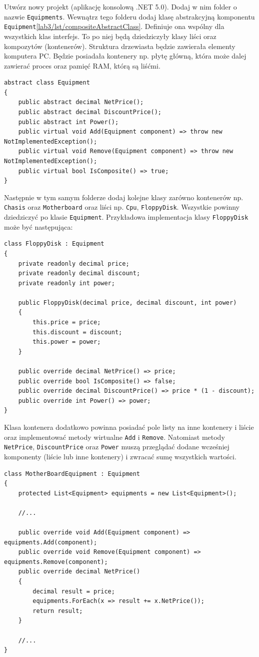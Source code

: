 Utwórz nowy projekt (aplikację konsolową .NET 5.0). Dodaj w nim folder o nazwie \texttt{Equipments}. Wewnątrz tego folderu dodaj klasę abstrakcyjną komponentu \texttt{Equipment}\ref{lab3/lst/compositeAbstractClass}. Definiuje ona wspólny dla wszystkich klas interfejs. To po niej będą dziedziczyły klasy liści oraz kompozytów (kontenerów). Struktura drzewiasta będzie zawierała elementy komputera PC. Będzie posiadała kontenery np. płytę główną, która może dalej zawierać proces oraz pamięć RAM, którą są liśćmi.
\begin{lstlisting}[caption={Przykład abstrakcyjnej klasy komponentu}, label={lab3/lst/compositeAbstractClass}]
abstract class Equipment
{
	public abstract decimal NetPrice();
	public abstract decimal DiscountPrice();	
	public abstract int Power();
	public virtual void Add(Equipment component) => throw new NotImplementedException();	
	public virtual void Remove(Equipment component) => throw new NotImplementedException();
	public virtual bool IsComposite() => true;
}
\end{lstlisting}
Następnie w tym samym folderze dodaj kolejne klasy zarówno kontenerów np. \texttt{Chasis} oraz \texttt{Motherboard} oraz liści np. \texttt{Cpu}, \texttt{FloppyDisk}. Wszystkie powinny dziedziczyć po klasie \texttt{Equipment}. Przykładowa implementacja klasy \texttt{FloppyDisk} może być następująca:
\begin{lstlisting}[caption={Przykład klasy będącej liściem kompozytu}, label={lab3/lst/compositeLeafFloppyDisk}]
class FloppyDisk : Equipment
{
	private readonly decimal price;
	private readonly decimal discount;
	private readonly int power;
	
	public FloppyDisk(decimal price, decimal discount, int power)
	{
		this.price = price;
		this.discount = discount;
		this.power = power;
	}

	public override decimal NetPrice() => price;	
	public override bool IsComposite() => false;	
	public override decimal DiscountPrice() => price * (1 - discount);
	public override int Power() => power;
}
\end{lstlisting}
Klasa kontenera dodatkowo powinna posiadać pole listy na inne kontenery i liście oraz implementować metody wirtualne \texttt{Add} i \texttt{Remove}. Natomiast metody \texttt{NetPrice}, \texttt{DiscountPrice} oraz \texttt{Power} muszą przeglądać dodane wcześniej komponenty (liście lub inne kontenery) i zwracać sumę wszystkich wartości.
\begin{lstlisting}
class MotherBoardEquipment : Equipment
{
	protected List<Equipment> equipments = new List<Equipment>();

	//...
		
	public override void Add(Equipment component) => equipments.Add(component);	
	public override void Remove(Equipment component) => equipments.Remove(component);
	public override decimal NetPrice()
	{
		decimal result = price;
		equipments.ForEach(x => result += x.NetPrice());	
		return result;
	}
		
	//...
}
\end{lstlisting}

